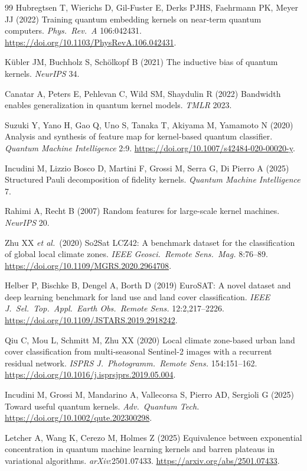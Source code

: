 \documentclass[pdflatex,sn-mathphys-num]{sn-jnl}
\theoremstyle{thmstyleone}
\theoremstyle{thmstyletwo}
\theoremstyle{thmstylethree}
\begin{document}
\begin{thebibliography}{99}
Hubregtsen T, Wierichs D, Gil-Fuster E, Derks PJHS, Faehrmann PK,
Meyer JJ (2022) Training quantum embedding kernels on near-term
quantum computers. \textit{Phys.\ Rev.\ A} 106:042431.
\url{https://doi.org/10.1103/PhysRevA.106.042431}.

K{\"u}bler JM, Buchholz S, Sch{\"o}lkopf B (2021) The inductive bias of
quantum kernels. \textit{NeurIPS} 34.

Canatar A, Peters E, Pehlevan C, Wild SM, Shaydulin R (2022) Bandwidth
enables generalization in quantum kernel models.
\textit{TMLR} 2023.

Suzuki Y, Yano H, Gao Q, Uno S, Tanaka T, Akiyama M, Yamamoto N (2020)
Analysis and synthesis of feature map for kernel-based quantum classifier.
\textit{Quantum Machine Intelligence} 2:9.
\url{https://doi.org/10.1007/s42484-020-00020-y}.

Incudini M, Lizzio Bosco D, Martini F, Grossi M, Serra G, Di Pierro A
(2025) Structured Pauli decomposition of fidelity kernels.
\textit{Quantum Machine Intelligence} 7.

Rahimi A, Recht B (2007) Random features for large-scale kernel machines.
\textit{NeurIPS} 20.

Zhu XX \emph{et al.}\ (2020) So2Sat LCZ42: A benchmark dataset for the
classification of global local climate zones.
\textit{IEEE Geosci.\ Remote Sens.\ Mag.} 8:76--89.
\url{https://doi.org/10.1109/MGRS.2020.2964708}.

Helber P, Bischke B, Dengel A, Borth D (2019) EuroSAT: A novel dataset
and deep learning benchmark for land use and land cover classification.
\textit{IEEE J.\ Sel.\ Top.\ Appl.\ Earth Obs.\ Remote Sens.}
12:2{,}217--2226.
\url{https://doi.org/10.1109/JSTARS.2019.2918242}.

Qiu C, Mou L, Schmitt M, Zhu XX (2020) Local climate zone-based urban
land cover classification from multi-seasonal Sentinel-2 images with
a recurrent residual network.
\textit{ISPRS J.\ Photogramm.\ Remote Sens.} 154:151--162.
\url{https://doi.org/10.1016/j.isprsjprs.2019.05.004}.

Incudini M, Grossi M, Mandarino A, Vallecorsa S, Pierro AD,
Sergioli G (2025) Toward useful quantum kernels.
\textit{Adv.\ Quantum Tech.}
\url{https://doi.org/10.1002/qute.202300298}.

Letcher A, Wang K, Cerezo M, Holmes Z (2025)
Equivalence between exponential concentration in quantum machine
learning kernels and barren plateaus in variational algorithms.
\textit{arXiv}:2501.07433.
\url{https://arxiv.org/abs/2501.07433}.


\end{thebibliography}
\end{document}
